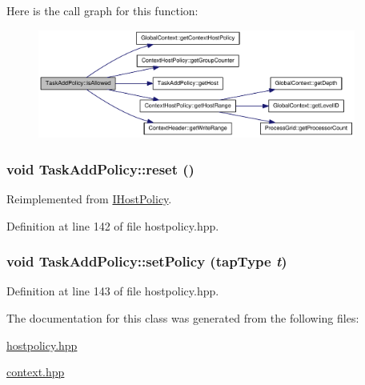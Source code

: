 Here is the call graph for this function:\nopagebreak
\begin{figure}[H]
\begin{center}
\leavevmode
\includegraphics[width=296pt]{class_task_add_policy_a80261d7262611c29d2b483e4e73cc204_cgraph}
\end{center}
\end{figure}
\hypertarget{class_task_add_policy_a5ce62af8541c3e3001d5b373799c1228}{
\subsubsection[{reset}]{\setlength{\rightskip}{0pt plus 5cm}void TaskAddPolicy::reset ()}}
\label{class_task_add_policy_a5ce62af8541c3e3001d5b373799c1228}


Reimplemented from \hyperlink{class_i_host_policy_a76602bc70073ed8eb476d9ddacdef74f}{IHostPolicy}.

Definition at line 142 of file hostpolicy.hpp.\hypertarget{class_task_add_policy_a6fa0ab3a3c239febfe7de3da0117f96f}{
\subsubsection[{setPolicy}]{\setlength{\rightskip}{0pt plus 5cm}void TaskAddPolicy::setPolicy ({\bf tapType} {\em t})}}
\label{class_task_add_policy_a6fa0ab3a3c239febfe7de3da0117f96f}


Definition at line 143 of file hostpolicy.hpp.

The documentation for this class was generated from the following files:\begin{DoxyCompactItemize}
\item 
\hyperlink{hostpolicy_8hpp}{hostpolicy.hpp}\item 
\hyperlink{context_8hpp}{context.hpp}\end{DoxyCompactItemize}
